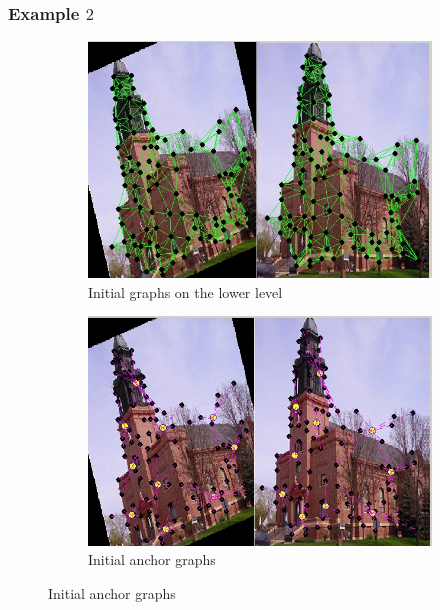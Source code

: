 \documentclass[
	fontsize=12pt,
	paper=a4,
	twoside=false,
	numbers=noenddot,
	plainheadsepline,
	toc=listof,
	toc=bibliography
]{scrartcl}
\makeatletter
\providecommand\phantomcaption{\caption@refstepcounter\@captype}
\makeatother
\begin{document}
\subsubsection{Example $2$}
\begin{figure}[hbt] 
	\begin{subfigure}[b]{0.5\textwidth}
		\centering
		\includegraphics[scale=0.3]{fig/method2/test_imagetrafo2/initial_graphs.jpg} 
		\caption{Initial graphs on the lower level} 
	\end{subfigure}%
	\begin{subfigure}[b]{0.5\textwidth}
		\centering
		\includegraphics[scale=0.3]{fig/method2/test_imagetrafo2/initial_anchorgraphs.jpg} 
		\caption{Initial anchor graphs} 
	\end{subfigure} 
	\phantomcaption
	\end{figure}
	
\end{document}
